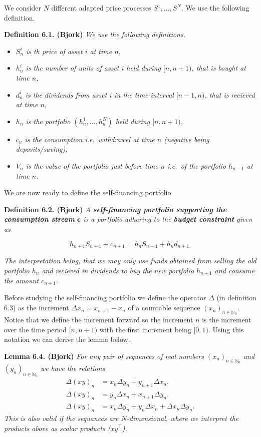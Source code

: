 \documentclass[
]{book}
\providecommand{\tightlist}{%
  \setlength{\itemsep}{0pt}\setlength{\parskip}{0pt}}
\begin{document}
We consider \(N\) different adapted price processes \(S^1,...,S^N\). We use the following definition.

\textbf{Definition 6.1. (Bjork)} \emph{We use the following definitions.}

\begin{itemize}
\tightlist
\item
  \emph{\(S_n^i\) is th price of asset \(i\) at time \(n\),}
\item
  \emph{\(h_n^i\) is the number of units of asset \(i\) held during \([n,n+1)\), that is bought at time \(n\),}
\item
  \emph{\(d_n^i\) is the dividends from asset \(i\) in the time-interval \([n-1,n)\), that is recieved at time \(n\),}
\item
  \emph{\(h_n\) is the portfolio \((h_n^1,...,h_n^N)\) held during \([n,n+1)\),}
\item
  \emph{\(c_n\) is the consumption i.e.~withdrawel at time \(n\) (negative being deposits/saving),}
\item
  \emph{\(V_n\) is the value of the portfolio just before time \(n\) i.e.~of the portfolio \(h_{n-1}\) at time \(n\).}
\end{itemize}

We are now ready to define the self-financing portfolio

\textbf{Definition 6.2. (Bjork)} \emph{A \textbf{self-financing portfolio supporting the consumption stream} \(\mathbf{c}\) is a portfolio adhering to the \textbf{budget constraint} given as}

\[
h_{n+1}S_{n+1}+c_{n+1}=h_nS_{n+1}+h_nd_{n+1.}
\]

\emph{The interpretation being, that we may only use funds obtained from selling the old portfolio \(h_n\) and recieved in dividends to buy the new portfolio \(h_{n+1}\) and consume the amount \(c_{n+1}\).}

Before studying the self-financing portfolio we define the operator \(\Delta\) (in definition 6.3) as the increment \(\Delta x_n=x_{n+1}-x_n\) of a countable sequence \((x_n)_{n\in\mathbb{N}_0}\). Notice that we define the increment forward so the increment \(n\) is the increment over the time period \([n,n+1)\) with the first increment being \([0,1)\). Using this notation we can derive the lemma below.

\textbf{Lemma 6.4. (Bjork)} \emph{For any pair of sequences of real numbers \((x_n)_{n\in\mathbb{N}_0}\) and \((y_n)_{n\in\mathbb{N}_0}\) we have the relations}
\begin{align*}
\Delta(xy)_n&=x_n\Delta y_n+y_{n+1}\Delta x_n,\tag{6.5}\\
\Delta(xy)_n&=y_n\Delta x_n+x_{n+1}\Delta y_n,\tag{6.6}\\
\Delta(xy)_n&=x_n\Delta y_n+y_n\Delta x_n+\Delta x_n\Delta y_n.\tag{6.7}
\end{align*}
\emph{This is also valid if the sequances are \(N\)-dimensional, where we interpret the products above as scalar products (\(xy^\top\)).}
\end{document}
